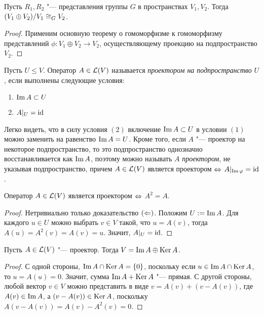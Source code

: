 \begin{proposition}
	Пусть $R_1, R_2$ "--- представления группы $G$ в пространствах $V_1, V_2$. Тогда $(V_1 \oplus V_2) / V_1 \cong_G V_2$.
\end{proposition}

\begin{proof}
	Применим основную теорему о гомоморфизме к гомоморфизму представлений $\phi: V_1 \oplus V_2 \to V_2$, осуществляющему проекцию на подпространство $V_2$.
\end{proof}

\begin{definition}
	Пусть $U \le V$. Оператор $A \in \mathcal L(V)$ называется \textit{проектором на подпространство} $U$, если выполнены следующие условия:
	\begin{enumerate}
		\item $\operatorname{Im} A \subset U$
		\item $A|_{U} = \mathrm{id}$
	\end{enumerate}
\end{definition}

\begin{note}
	Легко видеть, что в силу условия $(2)$ включение $\operatorname{Im} A \subset U$ в условии $(1)$ можно заменить на равенство $\operatorname{Im} A = U$. Кроме того, если $A$ "--- проектор на некоторое подпространство, то это подпространство однозначно восстанавливается как $\operatorname{Im} A$, поэтому можно называть $A$ \textit{проектором}, не указывая подпространство, причем $A \in \mathcal L(V)$ является проектором $\Leftrightarrow$ $A|_{\operatorname{Im}\varphi} = \mathrm{id}$.
\end{note}

\begin{proposition}
	Оператор $A \in \mathcal L(V)$ является проектором $\Leftrightarrow$ $A^2 = A$.
\end{proposition}

\begin{proof}
	Нетривиально только доказательство $(\Leftarrow)$. Положим $U := \operatorname{Im}{A}$. Для каждого $u \in U$ можно выбрать $v \in V$ такой, что $u = A(v)$, тогда $A(u) = A^2(v) = A(v) = u$. Значит, $A|_U = \mathrm{id}$.
\end{proof}

\begin{proposition}
	Пусть $A \in \mathcal L(V)$ "--- проектор. Тогда $V = \operatorname{Im}{A} \oplus \operatorname{Ker}{A}$.
\end{proposition}

\begin{proof}
	С одной стороны, $\operatorname{Im}{A} \cap \operatorname{Ker}{A} = \{0\}$, поскольку если $u \in \operatorname{Im}{A} \cap \operatorname{Ker}{A}$, то $u = A(u) = 0$. Значит, сумма $\operatorname{Im}{A} + \operatorname{Ker}{A}$ "--- прямая. С другой стороны, любой вектор $v \in V$ можно представить в виде $v = A(v) + (v - A(v))$, где $A(v) \in \operatorname{Im}{A}$, а $(v - A(v)) \in \operatorname{Ker}{A}$, поскольку $A(v - A(v)) = A(v) - A^2(v) = 0$.
\end{proof}

